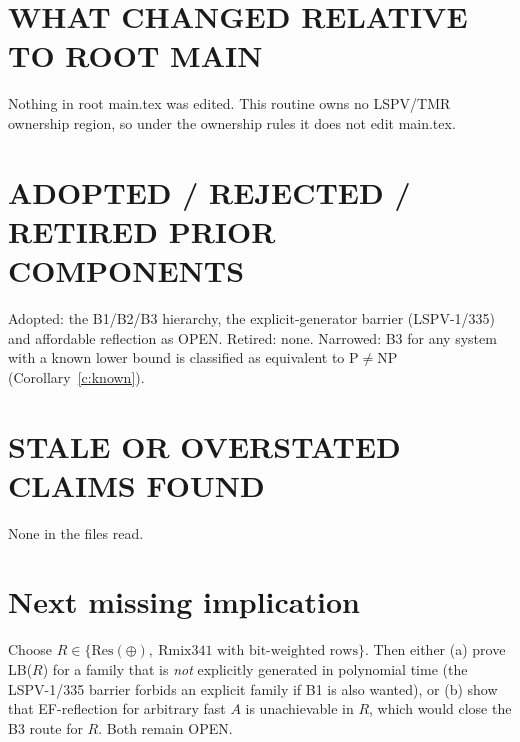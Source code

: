 \documentclass[11pt]{article}
\theoremstyle{definition}
\begin{document}
\section*{WHAT CHANGED RELATIVE TO ROOT MAIN}
Nothing in root main.tex was edited. This routine owns no LSPV/TMR ownership
region, so under the ownership rules it does not edit main.tex.

\section*{ADOPTED / REJECTED / RETIRED PRIOR COMPONENTS}
Adopted: the B1/B2/B3 hierarchy, the explicit-generator barrier (LSPV-1/335) and
affordable reflection as OPEN. Retired: none. Narrowed: B3 for any system with a
known lower bound is classified as equivalent to P$\ne$NP (Corollary~\ref{c:known}).

\section*{STALE OR OVERSTATED CLAIMS FOUND}
None in the files read.

\section*{Next missing implication}
Choose $R\in\{\mathrm{Res}(\oplus),\ \text{Rmix341 with bit-weighted rows}\}$. Then
either (a) prove LB($R$) for a family that is \emph{not} explicitly generated in
polynomial time (the LSPV-1/335 barrier forbids an explicit family if B1 is also
wanted), or (b) show that EF-reflection for arbitrary fast $A$ is unachievable
in $R$, which would close the B3 route for $R$. Both remain OPEN.
\end{document}
